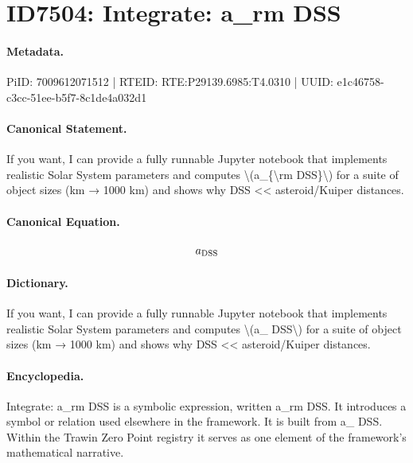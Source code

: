 \section*{ID7504: Integrate: a\_rm DSS}
\paragraph{Metadata.}
PiID: 7009612071512 | RTEID: RTE:P29139.6985:T4.0310 | UUID: e1c46758-c3cc-51ee-b5f7-8c1de4a032d1

\paragraph{Canonical Statement.}
If you want, I can provide a fully runnable Jupyter notebook that implements realistic Solar System parameters and computes \textbackslash{}(a\_\{\textbackslash{}rm DSS\}\textbackslash{}) for a suite of object sizes (km → 1000 km) and shows why DSS << asteroid/Kuiper distances.

\paragraph{Canonical Equation.}
\[
a_{\rm DSS}
\]

\paragraph{Dictionary.}
If you want, I can provide a fully runnable Jupyter notebook that implements realistic Solar System parameters and computes \textbackslash{}(a\_ DSS\textbackslash{}) for a suite of object sizes (km → 1000 km) and shows why DSS << asteroid/Kuiper distances.

\paragraph{Encyclopedia.}
Integrate: a\_rm DSS is a symbolic expression, written a\_rm DSS. It introduces a symbol or relation used elsewhere in the framework. It is built from a\_ DSS. Within the Trawin Zero Point registry it serves as one element of the framework's mathematical narrative.
